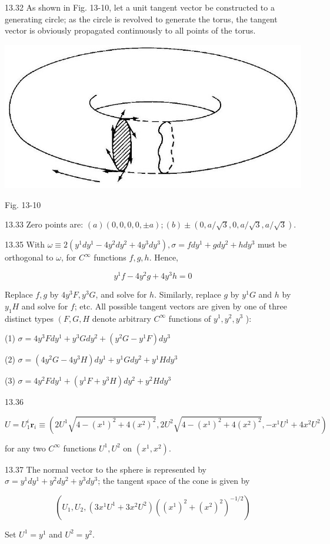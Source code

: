 \documentclass[10pt]{article}
\begin{document}
13.32 As shown in Fig. 13-10, let a unit tangent vector be constructed to a generating circle; as the circle is revolved to generate the torus, the tangent vector is obviously propagated continuously to all points of the torus.

\begin{center}
\includegraphics[max width=\textwidth]{2024_04_03_41f90be4f896e21f0dc9g-231(1)}
\end{center}

Fig. 13-10

13.33 Zero points are: $(a)(0,0,0,0, \pm a) ;(b) \pm(0, a / \sqrt{3}, 0, a / \sqrt{3}, a / \sqrt{3})$.

13.35 With $\omega \equiv 2\left(y^{1} d y^{1}-4 y^{2} d y^{2}+4 y^{3} d y^{3}\right), \sigma=f d y^{1}+g d y^{2}+h d y^{3}$ must be orthogonal to $\omega$, for $C^{\infty}$ functions $f, g, h$. Hence,

$$
y^{1} f-4 y^{2} g+4 y^{3} h=0
$$

Replace $f, g$ by $4 y^{3} F, y^{3} G$, and solve for $h$. Similarly, replace $g$ by $y^{1} G$ and $h$ by $y_{1} H$ and solve for $f$; etc. All possible tangent vectors are given by one of three distinct types $\left(F, G, H\right.$ denote arbitrary $C^{\infty}$ functions of $y^{1}, y^{2}, y^{3}$ ):

(1) $\sigma=4 y^{3} F d y^{1}+y^{3} G d y^{2}+\left(y^{2} G-y^{1} F\right) d y^{3}$

(2) $\sigma=\left(4 y^{2} G-4 y^{3} H\right) d y^{1}+y^{1} G d y^{2}+y^{1} H d y^{3}$

(3) $\sigma=4 y^{2} F d y^{1}+\left(y^{1} F+y^{3} H\right) d y^{2}+y^{2} H d y^{3}$

13.36

$$
U=U_{1}^{i} \mathbf{r}_{i} \equiv\left(2 U^{1} \sqrt{4-\left(x^{1}\right)^{2}+4\left(x^{2}\right)^{2}}, 2 U^{2} \sqrt{4-\left(x^{1}\right)^{2}+4\left(x^{2}\right)^{2}},-x^{1} U^{1}+4 x^{2} U^{2}\right)
$$

for any two $C^{\infty}$ functions $U^{1}, U^{2}$ on $\left(x^{1}, x^{2}\right)$.

13.37 The normal vector to the sphere is represented by $\sigma=y^{1} d y^{1}+y^{2} d y^{2}+y^{3} d y^{3}$; the tangent space of the cone is given by

$$
\left(U_{1}, U_{2},\left(3 x^{1} U^{1}+3 x^{2} U^{2}\right)\left(\left(x^{1}\right)^{2}+\left(x^{2}\right)^{2}\right)^{-1 / 2}\right)
$$

Set $U^{1}=y^{1}$ and $U^{2}=y^{2}$.
\end{document}
